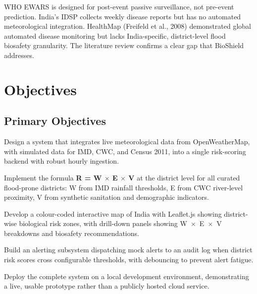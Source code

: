 \documentclass[12pt,a4paper]{report}
\begin{document}
WHO EWARS is designed for post-event passive surveillance, not pre-event prediction. India's IDSP collects weekly disease reports but has no automated meteorological integration. HealthMap (Freifeld et al., 2008) demonstrated global automated disease monitoring but lacks India-specific, district-level flood biosafety granularity. The literature review confirms a clear gap that BioShield addresses.

\chapter{Objectives}

\section{Primary Objectives}

\begin{description}[style=nextline, leftmargin=1.5cm]
  \item[O1. Integrated Data Architecture.] Design a system that integrates live meteorological data from OpenWeatherMap, with simulated data for IMD, CWC, and Census 2011, into a single risk-scoring backend with robust hourly ingestion.

  \item[O2. Biological Risk Scoring Engine.] Implement the formula \textbf{R = W $\times$ E $\times$ V} at the district level for all curated flood-prone districts: W from IMD rainfall thresholds, E from CWC river-level proximity, V from synthetic sanitation and demographic indicators.

  \item[O3. Interactive Web Dashboard.] Develop a colour-coded interactive map of India with Leaflet.js showing district-wise biological risk zones, with drill-down panels showing W~$\times$~E~$\times$~V breakdowns and biosafety recommendations.

  \item[O4. Multi-Channel Alerting.] Build an alerting subsystem dispatching mock alerts to an audit log when district risk scores cross configurable thresholds, with debouncing to prevent alert fatigue.

  \item[O5. Local Deployment.] Deploy the complete system on a local development environment, demonstrating a live, usable prototype rather than a publicly hosted cloud service.
\end{description}
\end{document}
